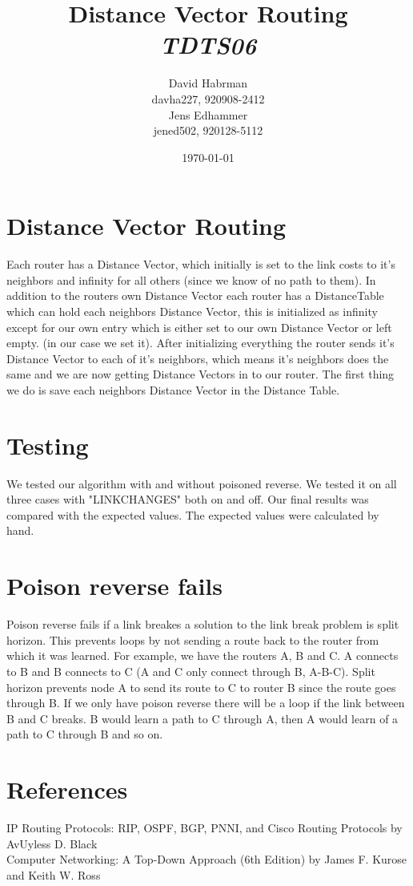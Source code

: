 \documentclass[10pt]{article}
\title{Distance Vector Routing\\
\emph{TDTS06}}
\author{David Habrman \\ davha227, 920908-2412\\
Jens Edhammer \\ jened502, 920128-5112 }
\date{\today}
\begin{document}
\maketitle

\newpage
\tableofcontents
\newpage

\section{Distance Vector Routing}
Each router has a Distance Vector, which initially is set to the link costs to
it's neighbors and infinity for all others (since we know of no path to them).
In addition to the routers own Distance Vector each router has a DistanceTable
which can hold each neighbors Distance Vector, this is initialized as infinity
except for our own entry which is either set to our own Distance Vector or left
empty. (in our case we set it). After initializing everything the router sends
it's Distance Vector to each of it's neighbors, which means it's neighbors does
the same and we are now getting Distance Vectors in to our router. The first
thing we do is save each neighbors Distance Vector in the Distance Table.

\section{Testing}
We tested our algorithm with and without poisoned reverse. We tested it on all
three cases with "LINKCHANGES" both on and off. Our final results was compared
with the expected values. The expected values were calculated by hand.

\section{Poison reverse fails}
Poison reverse fails if a link breakes a solution to the link break problem is
split horizon. This prevents loops by not sending a route back to the router
from which it was learned. For example, we have the routers A, B and C. A
connects to B and B connects to C (A and C only connect through B, A-B-C).
Split horizon prevents node A to send its route to C to router B since the
route goes through B. If we only have poison reverse there will be a loop
if the link between B and C breaks. B would learn a path to C through A,
then A would learn of a path to C through B and so on.

\section{References}
IP Routing Protocols: RIP, OSPF, BGP, PNNI, and Cisco Routing Protocols by  AvUyless D. Black \\
Computer Networking: A Top-Down Approach (6th Edition) by James F. Kurose and Keith W. Ross
\end{document}
